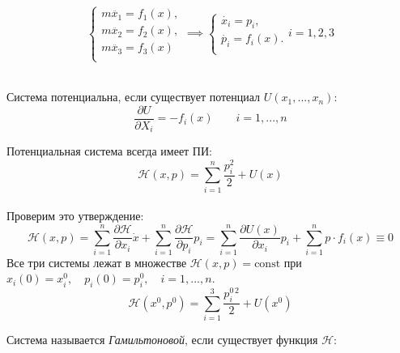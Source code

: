 \begin{example}
	$$
		\begin{cases}
			m\ddot{x_1}=f_1(x), \\
			m\ddot{x_2}=f_2(x), \\
			m\ddot{x_3}=f_3(x) \\
		\end{cases} \implies
		\begin{cases}
			\dot{x_i}=p_i,\\
			\dot{p_i}=f_i(x).\\
		\end{cases}	
		i=1,2,3$$\\
	
	\begin{definition}
		Система потенциальна, если существует  потенциал $U(x_1, ..., x_n)$:\\
		$$
			\frac{\partial U}{\partial X_i}=-f_i(x) \qquad i=1, ..., n
		$$
	\end{definition}
	Потенциальная система всегда имеет ПИ:\\
	$$
		\mathcal{H}(x,p)=\sum_{i=1}^n{\frac{p_i^2}{2}+U(x)}
	$$\\
	Проверим это утверждение:\\
$$\mathcal H(x,p)=\sum_{i=1}^n{\frac{\partial \mathcal H}{\partial x_i}\dot{x}}+\sum_{i=1}^n{\frac{\partial \mathcal H}{\partial p_i}p_i}=\sum_{i=1}^n{\frac{\partial U(x)}{\partial x_i}p_i}+\sum_{i=1}^n{p \cdot f_i(x)}\equiv 0$$
	Все три системы лежат в множестве $\mathcal{H}(x, p) = \mbox{const}$ при $x_i(0) = x_i^0, \quad p_i(0) = p_i^0, \quad i = 1, ..., n$.
	$$
		\mathcal H(x^0,p^0)=\sum_{i=1}^3{\frac{p_i^{0\,2}}{2}+U(x^0)}
	$$

	\begin{definition}
		Система называется \textit{Гамильтоновой}, если существует функция $\mathcal{H}$:


\end{definition}
\end{example}
